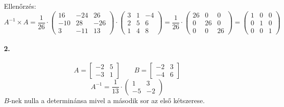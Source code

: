 \documentclass[12pt,a4paper,fleqn]{article}
\newcommand{\myparagraph}[1]{\paragraph{#1}\mbox{}}
\begin{document}
Ellenőrzés:
\[
  A^{-1} \times A =
  \dfrac{1}{26} \cdot
  \begin{pmatrix}
    16 & -24 & 26 \\
    -10 & 28 & -26 \\
    3 & -11 & 13
  \end{pmatrix}
  \cdot
  \begin{pmatrix}
    3 & 1 & -4 \\
    2 & 5 & 6 \\
    1 & 4 & 8
  \end{pmatrix}
  =
  \dfrac{1}{26} \cdot
  \begin{pmatrix}
    26 & 0  & 0 \\
    0  & 26 & 0 \\
    0  & 0  & 26
  \end{pmatrix}
  =
  \begin{pmatrix}
    1 & 0  & 0 \\
    0  & 1 & 0 \\
    0  & 0  & 1
  \end{pmatrix}
\]


\myparagraph{2.}
\[
  A = \begin{bmatrix} -2 & 5 \\ -3 & 1 \end{bmatrix}
  \qquad
  B = \begin{bmatrix} -2 & 3 \\ -4 & 6 \end{bmatrix}
\]
\[
  A^{-1} = \dfrac{1}{13} \cdot \begin{pmatrix} 1 & 3 \\ -5 & -2 \end{pmatrix}
\]
$B$-nek nulla a determinánsa mivel a második sor az első kétszerese.

\clearpage
\tableofcontents
\end{document}
